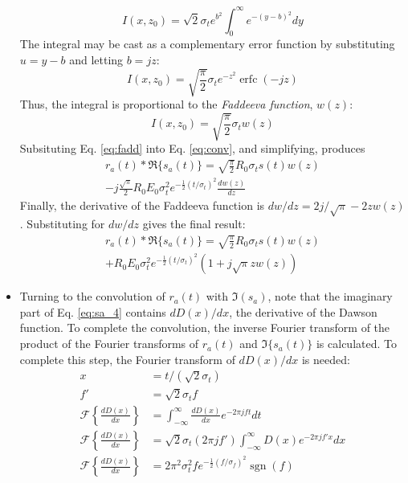 \documentclass[amsmath,amssymb,aps,prd,10pt,twocolumn,showkeys]{revtex4}
\DeclareMathOperator\erfc{erfc}
\DeclareMathOperator{\sgn}{sgn}
\begin{document}
\begin{itemize}
\begin{equation}
I(x,z_0) = \sqrt{2}\sigma_t e^{b^2} \int_0^{\infty} e^{-(y-b)^2} dy
\end{equation}
The integral may be cast as a complementary error function by substituting $u=y-b$ and letting $b=jz$:
\begin{equation}
I(x,z_0) = \sqrt{\frac{\pi}{2}}\sigma_t e^{-z^2}\erfc(-jz)
\end{equation}
Thus, the integral is proportional to the \textit{Faddeeva function}, $w(z)$:
\begin{equation}
I(x,z_0) = \sqrt{\frac{\pi}{2}} \sigma_t w(z) \label{eq:fadd}
\end{equation}
Subsituting Eq. \ref{eq:fadd} into Eq. \ref{eq:conv}, and simplifying, produces
\begin{multline}
r_a(t) * \Re\lbrace s_a(t) \rbrace = \sqrt{\frac{\pi}{2}}R_0 \sigma_t s(t) w(z) \\
-j\frac{\sqrt{\pi}}{2} R_0 E_0 \sigma_t^2 e^{-\frac{1}{2}(t/\sigma_t)^2} \frac{dw(z)}{dz}
\end{multline}
Finally, the derivative of the Faddeeva function is $dw/dz = 2j/\sqrt{\pi} - 2 zw(z)$.  Substituting for $dw/dz$ gives the final result:
\begin{multline}
r_a(t) * \Re\lbrace s_a(t) \rbrace = \sqrt{\frac{\pi}{2}}R_0 \sigma_t s(t) w(z) \\
+ R_0 E_0 \sigma_t^2 e^{-\frac{1}{2}(t/\sigma_t)^2}(1+j\sqrt{\pi} z w(z)) \label{eq:Re_result}
\end{multline}
\item Turning to the convolution of $r_a(t)$ with $\Im(s_a)$, note that the imaginary part of Eq. \ref{eq:sa_4} contains $dD(x)/dx$, the derivative of the Dawson function.  To complete the convolution, the inverse Fourier transform of the product of the Fourier transforms of $r_a(t)$ and $\Im\lbrace s_a(t)\rbrace$ is calculated.  To complete this step, the Fourier transform of $dD(x)/dx$ is needed:
\begin{align}
x &= t/(\sqrt{2}\sigma_t) \\
f' &= \sqrt{2} \sigma_t f \\
\mathcal{F}\left\lbrace \frac{dD(x)}{dx}\right\rbrace &= \int_{-\infty}^{\infty} \frac{dD(x)}{dx}e^{-2\pi jft} dt \\
\mathcal{F}\left\lbrace \frac{dD(x)}{dx}\right\rbrace &= \sqrt{2}\sigma_t(2\pi jf') \int_{-\infty}^{\infty} D(x) e^{-2\pi jf'x} dx \\
\mathcal{F}\left\lbrace \frac{dD(x)}{dx}\right\rbrace &= 2\pi^2 \sigma_t^2 f e^{-\frac{1}{2}(f/\sigma_f)^2} \sgn(f)

\end{align}
\end{itemize}
\end{document}
